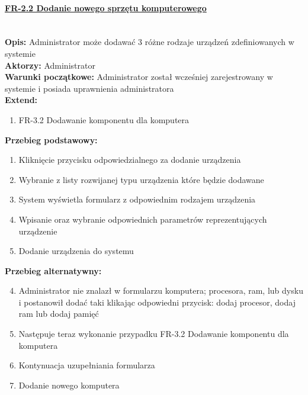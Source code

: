 \paragraph{\underline{FR-2.2 Dodanie nowego sprzętu komputerowego}}\mbox{}\\[1mm]
	\noindent\textbf{Opis:} Administrator może dodawać 3 różne rodzaje urządzeń zdefiniowanych w systemie\\
	\noindent\textbf{Aktorzy:} Administrator\\
	\textbf{Warunki początkowe:} Administrator został wcześniej zarejestrowany w systemie i posiada uprawnienia administratora\\
	\textbf{Extend:} 
	\begin{enumerate}[noparskip]
		\item FR-3.2 Dodawanie komponentu dla komputera
	\end{enumerate}
	\textbf{Przebieg podstawowy:}
	\begin{enumerate}[noparskip]
		\item Kliknięcie przycisku odpowiedzialnego za dodanie urządzenia
    \item Wybranie z listy rozwijanej typu urządzenia które będzie dodawane
		\item System wyświetla formularz z odpowiednim rodzajem urządzenia
		\item Wpisanie oraz wybranie odpowiednich parametrów reprezentujących urządzenie
		\item Dodanie urządzenia do systemu	\end{enumerate} 
	\textbf{Przebieg alternatywny:}
	\begin{enumerate}[noparskip]\setcounter{enumi}{3}
		\item Administrator nie znalazł w formularzu komputera; procesora, ram, lub dysku i postanowił dodać taki klikając odpowiedni przycisk: dodaj procesor, dodaj ram lub dodaj pamięć
		\item Następuje teraz wykonanie przypadku FR-3.2 Dodawanie komponentu dla komputera
		\item Kontynuacja uzupełniania formularza
		\item Dodanie nowego komputera
	\end{enumerate} 


